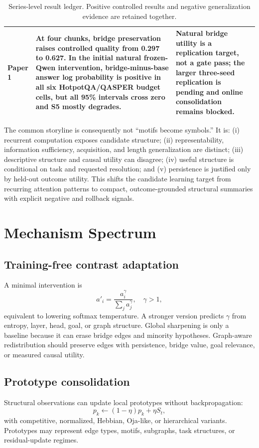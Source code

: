 \documentclass[11pt]{article}
\begin{document}
\begin{table}[H]
\begin{tabularx}{\linewidth}{p{.14\linewidth}X X}
Paper 1 & At four chunks, bridge preservation raises controlled quality from 0.297 to 0.627. In the initial natural frozen-Qwen intervention, bridge-minus-base answer log probability is positive in all six HotpotQA/QASPER budget cells, but all 95\% intervals cross zero and S5 mostly degrades. & Natural bridge utility is a replication target, not a gate pass; the larger three-seed replication is pending and online consolidation remains blocked.\\
\bottomrule\end{tabularx}
\caption{Series-level result ledger. Positive controlled results and negative generalization evidence are retained together.}
\label{tab:status-ledger}
\end{table}

The common storyline is consequently not ``motifs become symbols.'' It is: (i) recurrent computation exposes candidate structure; (ii) representability, information sufficiency, acquisition, and length generalization are distinct; (iii) descriptive structure and causal utility can disagree; (iv) useful structure is conditional on task and requested resolution; and (v) persistence is justified only by held-out outcome utility. This shifts the candidate learning target from recurring attention patterns to compact, outcome-grounded structural summaries with explicit negative and rollback signals.

\section{Mechanism Spectrum}
\subsection{Training-free contrast adaptation}
A minimal intervention is
\[
a'_i=\frac{a_i^\gamma}{\sum_j a_j^\gamma},\quad \gamma>1,
\]
equivalent to lowering softmax temperature. A stronger version predicts $\gamma$ from entropy, layer, head, goal, or graph structure. Global sharpening is only a baseline because it can erase bridge edges and minority hypotheses. Graph-aware redistribution should preserve edges with persistence, bridge value, goal relevance, or measured causal utility.

\subsection{Prototype consolidation}
Structural observations can update local prototypes without backpropagation:
\[
p_k\leftarrow(1-\eta)p_k+\eta S_t,
\]
with competitive, normalized, Hebbian, Oja-like, or hierarchical variants. Prototypes may represent edge types, motifs, subgraphs, task structures, or residual-update regimes.
\end{document}
